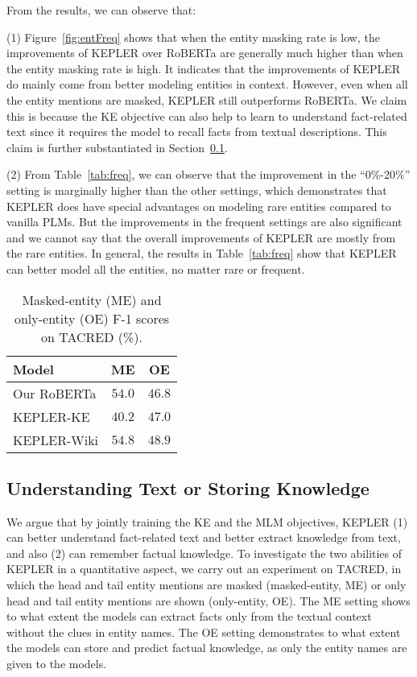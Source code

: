 From the results, we can observe that: 

(1) Figure~\ref{fig:entFreq} shows that when the entity masking rate is low, the improvements of KEPLER over RoBERTa are generally much higher than when the entity masking rate is high. It indicates that the improvements of KEPLER do mainly come from better modeling entities in context. However, even when all the entity mentions are masked, KEPLER still outperforms RoBERTa. We claim this is because the KE objective can also help to learn to understand fact-related text since it requires the model to recall facts from textual descriptions. This claim is further substantiated in Section~\ref{sec:uos}. 

(2) From Table~\ref{tab:freq}, we can observe that the improvement in the ``0\%-20\%'' setting is marginally higher than the other settings, which demonstrates that KEPLER does have special advantages on modeling rare entities compared to vanilla PLMs. But the improvements in the frequent settings are also significant and we cannot say that the overall improvements of KEPLER are mostly from the rare entities. In general, the results in Table~\ref{tab:freq} show that KEPLER can better model all the entities, no matter rare or frequent.

\begin{table}[h]
    \tablefont
	\centering
\begin{adjustbox}{max width=0.98\linewidth}
    \begin{tabular}{lcc}
        \toprule
        \textbf{Model} & \textbf{ME} & \textbf{OE}\\
        \midrule
        Our RoBERTa & $54.0$ & $46.8$\\
        KEPLER-KE & $40.2$ & $47.0$ \\
        KEPLER-Wiki & $54.8$ & $48.9$\\
        \bottomrule
    \end{tabular}
\end{adjustbox}
	\caption{Masked-entity (ME) and only-entity (OE) F-1 scores on TACRED (\%).}\label{tab:casestudy}
\end{table}

\subsection{Understanding Text or Storing Knowledge}


\label{sec:uos}

We argue that by jointly training the KE and the MLM objectives, KEPLER (1) can better understand fact-related text and better extract knowledge from text, and also (2) can remember factual knowledge. To investigate the two abilities of KEPLER in a quantitative aspect, we carry out an experiment on TACRED, in which the head and tail entity mentions are masked (masked-entity, ME) or only head and tail entity mentions are shown (only-entity, OE). The ME setting shows to what extent the models can extract facts only from the textual context without the clues in entity names. The OE setting demonstrates to what extent the models can store and predict factual knowledge, as only the entity names are given to the models.

